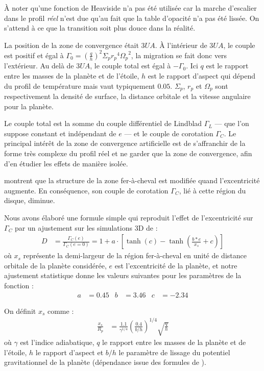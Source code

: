 À noter qu'une fonction de Heaviside n'a pas été utilisée car la marche d'escalier dans le profil \textit{réel} n'est due qu'au fait que la table d'opacité n'a pas été lissée. On s'attend à ce que la transition soit plus douce dans la réalité.

La position de la zone de convergence était $3\unit{UA}$. À l'intérieur de $3\unit{UA}$, le couple est positif et égal à $\Gamma_0 = \left(\frac{q}{h}\right)^2\Sigma_p {r_p}^4 {\Omega_p}^2$, la migration se fait donc vers l'extérieur. Au delà de $3\unit{UA}$, le couple total est égal à $-\Gamma_0$. Ici $q$ est le rapport entre les masses de la planète et de l'étoile, $h$ est le rapport d'aspect qui dépend du profil de température mais vaut typiquement $0.05$. $\Sigma_p$, $r_p$ et $\Omega_p$ sont respectivement la densité de surface, la distance orbitale et la vitesse angulaire pour la planète. 

Le couple total est la somme du couple différentiel de Lindblad $\Gamma_L$ --- que l'on suppose constant et indépendant de $e$ --- et le couple de corotation $\Gamma_C$. Le principal intérêt de la zone de convergence artificielle est de s'affranchir de la forme très complexe du profil réel et ne garder que la zone de convergence, afin d'en étudier les effets de manière isolée.

\bigskip

\cite{bitsch2010orbital} montrent que la structure de la zone fer-à-cheval est modifiée quand l'excentricité augmente. En conséquence, son couple de corotation $\Gamma_C$, lié à cette région du disque, diminue. 

Nous avons élaboré une formule simple qui reproduit l'effet de l'excentricité sur $\Gamma_C$ par un ajustement sur les
simulations 3D de \cite{bitsch2010orbital} : 
\begin{align}
D &= \frac{\Gamma_C(e)}{\Gamma_C (e=0)} = 1 + a \cdot \left[\tanh(c) - \tanh\left(\frac{b * e}{x_s}+c\right)\right]\label{eq:shifted-eccentricity-influence}
\end{align}
où $x_s$ représente la demi-largeur de la région fer-à-cheval en unité de distance orbitale de la planète considérée, $e$ est l'excentricité de la planète, et notre ajustement statistique donne les valeurs suivantes pour les paramètres de la fonction :
\begin{align}
a &= 0.45 & b &= 3.46 & c &= -2.34
\end{align}

On définit $x_s$ comme \citep[eq. (44)]{paardekooper2010torque} :
\begin{align}
\frac{x_s}{R_p} &= \frac{1.1}{\gamma^{1/4}} \left(\frac{0.4}{b/h}\right)^{1/4} \sqrt{\frac{q}{h}}
\end{align}
où $\gamma$ est l'indice adiabatique, $q$ le rapport entre les masses de la planète et de l'étoile, $h$ le rapport d'aspect et $b/h$ le paramètre de lissage du potentiel gravitationnel de la planète (dépendance issue des formules de \cite{paardekooper2011torque}).

